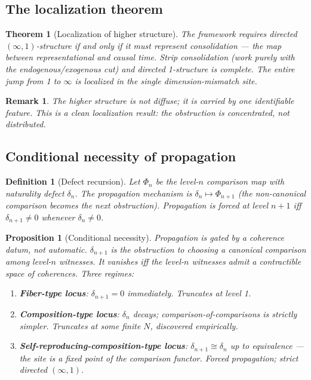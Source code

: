 \documentclass[11pt]{article}
\newtheorem{definition}{Definition}
\newtheorem{proposition}{Proposition}
\newtheorem{theorem}{Theorem}
\newtheorem{remark}{Remark}
\begin{document}
\subsection{The localization theorem}

\begin{theorem}[Localization of higher structure]
\label{thm:localization}
The framework requires directed $(\infty,1)$-structure if and only if it must represent
consolidation --- the map between representational and causal time. Strip consolidation
(work purely with the endogenous/exogenous cut) and directed 1-structure is complete.
The entire jump from 1 to $\infty$ is localized in the single dimension-mismatch site.
\end{theorem}

\begin{remark}
The higher structure is not diffuse; it is carried by one identifiable feature.
This is a clean localization result: the obstruction is concentrated, not distributed.
\end{remark}

\subsection{Conditional necessity of propagation}

\begin{definition}[Defect recursion]
\label{def:defect-recursion}
Let $\Phi_n$ be the level-$n$ comparison map with naturality defect $\delta_n$. The propagation
mechanism is $\delta_n \mapsto \Phi_{n+1}$ (the non-canonical comparison becomes the next
obstruction). Propagation is \emph{forced} at level $n+1$ iff $\delta_{n+1} \neq 0$ whenever
$\delta_n \neq 0$.
\end{definition}

\begin{proposition}[Conditional necessity]
\label{prop:conditional-necessity}
Propagation is gated by a coherence datum, not automatic. $\delta_{n+1}$ is the obstruction
to choosing a canonical comparison among level-$n$ witnesses. It vanishes iff the level-$n$
witnesses admit a contractible space of coherences. Three regimes:
\begin{enumerate}
  \item \textbf{Fiber-type locus}: $\delta_{n+1} = 0$ immediately. Truncates at level 1.
  \item \textbf{Composition-type locus}: $\delta_n$ decays; comparison-of-comparisons is strictly
  simpler. Truncates at some finite $N$, discovered empirically.
  \item \textbf{Self-reproducing-composition-type locus}: $\delta_{n+1} \cong \delta_n$ up to
  equivalence --- the site is a fixed point of the comparison functor. Forced propagation;
  strict directed $(\infty,1)$.
\end{enumerate}
\end{proposition}
\end{document}

